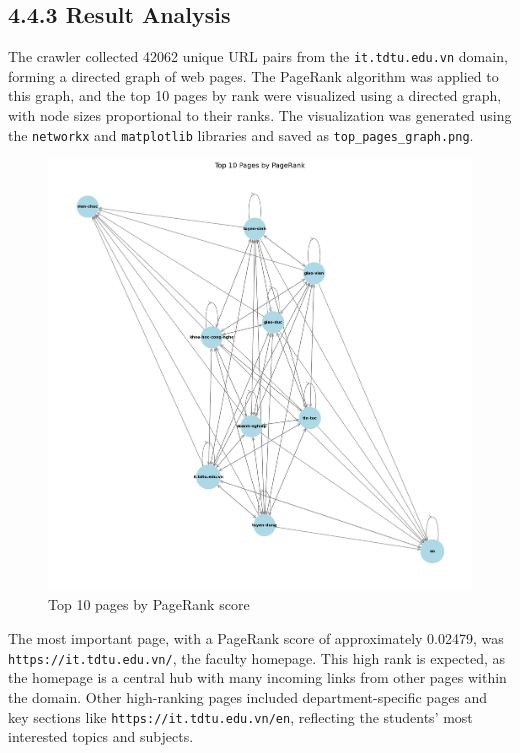 \documentclass{article}
\begin{document}
\subsection*{4.4.3 Result Analysis}

The crawler collected 42062 unique URL pairs from the \texttt{it.tdtu.edu.vn} domain, forming a directed graph of web pages. The PageRank algorithm was applied to this graph, and the top 10 pages by rank were visualized using a directed graph, with node sizes proportional to their ranks. The visualization was generated using the \texttt{networkx} and \texttt{matplotlib} libraries and saved as \texttt{top\_pages\_graph.png}.

\begin{figure}[h]
    \centering
    \includegraphics[width=0.7\linewidth]{graph.png}
    \caption{Top 10 pages by PageRank score}
    \label{fig:top_pages_graph}
\end{figure}

The most important page, with a PageRank score of approximately 0.02479, was \texttt{https://it.tdtu.edu.vn/}, the faculty homepage. This high rank is expected, as the homepage is a central hub with many incoming links from other pages within the domain. Other high-ranking pages included department-specific pages and key sections like \texttt{https://it.tdtu.edu.vn/en}, reflecting the students' most interested topics and subjects.
\end{document}
